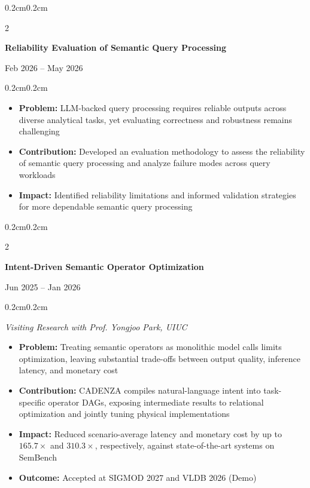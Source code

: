 \documentclass[10pt, letterpaper]{article}
\newenvironment{highlights}[1][]{
    \begin{itemize}[
        topsep=0.10cm,
        parsep=0.10cm,
        partopsep=0pt,
        itemsep=0pt,
        leftmargin=0.4cm+10pt,
        #1
    ]
}{
    \end{itemize}
}
\newenvironment{onecolentry}{
    \begin{adjustwidth}{0.2cm}{0.2cm}
}{
    \end{adjustwidth}
}
\newenvironment{twocolentry}[2][]{
    \onecolentry
    \def\secondColumn{#2}
    \setcolumnwidth{\fill, 4.5cm}
    \begin{paracol}{2}
}{
    \switchcolumn \raggedleft \secondColumn
    \end{paracol}
    \endonecolentry
}
\begin{document}
\vspace{2mm}

\begin{twocolentry}{Feb 2026 -- May 2026}
\textbf{Reliability Evaluation of Semantic Query Processing}
\end{twocolentry}
\begin{onecolentry}
\begin{highlights}[parsep=0pt]
    \item \textbf{Problem:} LLM-backed query processing requires reliable outputs across diverse analytical tasks, yet evaluating correctness and robustness remains challenging
    \item \textbf{Contribution:} Developed an evaluation methodology to assess the reliability of semantic query processing and analyze failure modes across query workloads
    \item \textbf{Impact:} Identified reliability limitations and informed validation strategies for more dependable semantic query processing
\end{highlights}
\end{onecolentry}

\vspace{2mm}

\begin{twocolentry}{Jun 2025 -- Jan 2026}
\textbf{Intent-Driven Semantic Operator Optimization}
\end{twocolentry}
\begin{onecolentry}
\textit{Visiting Research with Prof. Yongjoo Park, UIUC}
\begin{highlights}[parsep=0pt]
    \item \textbf{Problem:} Treating semantic operators as monolithic model calls limits optimization, leaving substantial trade-offs between output quality, inference latency, and monetary cost
    \item \textbf{Contribution:} CADENZA compiles natural-language intent into task-specific operator DAGs, exposing intermediate results to relational optimization and jointly tuning physical implementations
    \item \textbf{Impact:} Reduced scenario-average latency and monetary cost by up to $165.7\times$ and $310.3\times$, respectively, against state-of-the-art systems on SemBench
    \item \textbf{Outcome:} Accepted at SIGMOD 2027 and VLDB 2026 (Demo)
\end{highlights}
\end{onecolentry}
\end{document}
